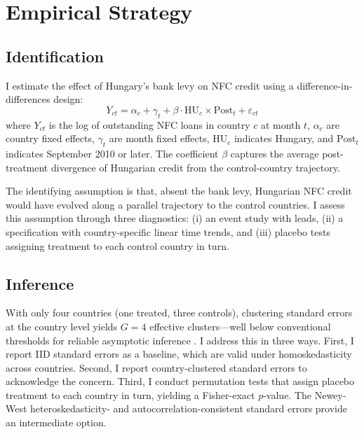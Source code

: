 \documentclass[12pt]{article}
\begin{document}



\section{Empirical Strategy}

\subsection{Identification}

I estimate the effect of Hungary's bank levy on NFC credit using a difference-in-differences design:
\begin{equation}
Y_{ct} = \alpha_c + \gamma_t + \beta \cdot \text{HU}_c \times \text{Post}_t + \varepsilon_{ct}
\label{eq:did}
\end{equation}
where $Y_{ct}$ is the log of outstanding NFC loans in country $c$ at month $t$, $\alpha_c$ are country fixed effects, $\gamma_t$ are month fixed effects, $\text{HU}_c$ indicates Hungary, and $\text{Post}_t$ indicates September 2010 or later. The coefficient $\beta$ captures the average post-treatment divergence of Hungarian credit from the control-country trajectory.

The identifying assumption is that, absent the bank levy, Hungarian NFC credit would have evolved along a parallel trajectory to the control countries. I assess this assumption through three diagnostics: (i) an event study with leads, (ii) a specification with country-specific linear time trends, and (iii) placebo tests assigning treatment to each control country in turn.

\subsection{Inference}

With only four countries (one treated, three controls), clustering standard errors at the country level yields $G = 4$ effective clusters---well below conventional thresholds for reliable asymptotic inference \citep{cameron2008}. I address this in three ways. First, I report IID standard errors as a baseline, which are valid under homoskedasticity across countries. Second, I report country-clustered standard errors to acknowledge the concern. Third, I conduct permutation tests that assign placebo treatment to each country in turn, yielding a Fisher-exact $p$-value. The Newey-West heteroskedasticity- and autocorrelation-consistent standard errors provide an intermediate option.
\end{document}
